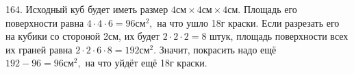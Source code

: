 164. Исходный куб будет иметь размер $4\text{см}\times4\text{см}\times4\text{см}.$ Площадь его поверхности равна $4\cdot4\cdot6=96\text{см}^2,$ на что ушло 18г краски. Если разрезать его на кубики со стороной 2см, их будет $2\cdot2\cdot2=8$ штук, площадь поверхности всех их граней равна $2\cdot2\cdot6\cdot8=192\text{см}^2.$ Значит, покрасить надо ещё $192-96=96\text{см}^2,$ на что уйдёт ещё 18г краски.\\
